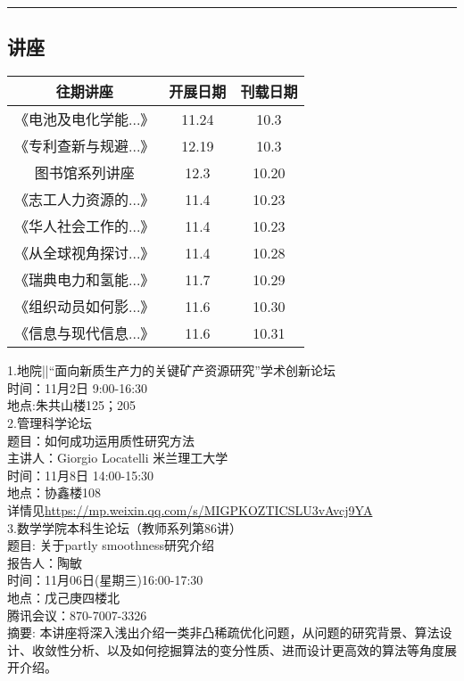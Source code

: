\documentclass[letterpaper, 12pt]{article}
\begin{document}
\hrule
\pagebreak
\begin{multicols}{2}

\section{讲座}
\begin{tabular}{|c|c|c|}
    \hline
    往期讲座 & 开展日期 & 刊载日期\\
    \hline\hline
    《电池及电化学能...》 & 11.24 & 10.3\\
    《专利查新与规避...》 & 12.19 & 10.3\\
    图书馆系列讲座 & 12.3 & 10.20\\
    《志工人力资源的...》 & 11.4 & 10.23\\
    《华人社会工作的...》 & 11.4 & 10.23\\
    《从全球视角探讨...》 & 11.4 & 10.28\\
    《瑞典电力和氢能...》 & 11.7 & 10.29\\
    《组织动员如何影...》 & 11.6 & 10.30\\
    《信息与现代信息...》 & 11.6 & 10.31\\
    
    \hline
\end{tabular}

1.地院||“面向新质生产力的关键矿产资源研究”学术创新论坛\\
时间：11月2日 9:00-16:30\\
地点:朱共山楼125；205\\

2.管理科学论坛\\
题目：如何成功运用质性研究方法\\
主讲人：Giorgio Locatelli 米兰理工大学\\
时间：11月8日 14:00-15:30\\
地点：协鑫楼108\\
详情见\url{https://mp.weixin.qq.com/s/MIGPKOZTICSLU3vAvcj9YA}\\

3.数学学院本科生论坛（教师系列第86讲）\\
题目: 关于partly smoothness研究介绍\\
报告人：陶敏\\
时间：11月06日(星期三)16:00-17:30\\
地点：戊己庚四楼北\\
腾讯会议：870-7007-3326\\
摘要:  本讲座将深入浅出介绍一类非凸稀疏优化问题，从问题的研究背景、算法设计、收敛性分析、以及如何挖掘算法的变分性质、进而设计更高效的算法等角度展开介绍。\\




\end{multicols}
\end{document}
